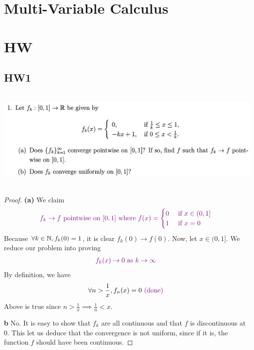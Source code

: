 \documentclass{report}
\begin{document}
\chapter{Multi-Variable Calculus}
\section{}
\chapter{HW}
\section{HW1}
\begin{question}{}{}
\includegraphics[height=5cm,width=18cm]{HW1.7}
\end{question}
\begin{proof}
\textbf{(a)} 
We claim 
\begin{align*}
\textcolor{violet}{f_k \to f\text{ pointwise  on $[0,1]$ where }f(x)=\begin{cases}
    0& \text{ if $x\in (0,1]$ } \\
    1& \text{ if $x=0$ }
\end{cases}}
\end{align*}
Because $\forall k\in\mathbb{N}, f_k(0)=1$, it is clear $f_k(0)\to f(0)$. Now, let $x \in (0,1]$. We reduce our problem into proving 
\begin{align*}
\textcolor{violet}{f_k(x)\to 0\text{ as $k \to \infty$ }}
\end{align*}
By definition, we have 
\begin{align*}
\forall n>\frac{1}{x}, f_n(x)=0\textcolor{violet}{\text{ (done) }}
\end{align*}
Above is true since $n>\frac{1}{x}\implies \frac{1}{n}<x$. 

\textbf{b}
No. It is easy to show that $f_k$ are all continuous and that $f$ is discontinuous at $0$. This let us deduce that the convergence is not uniform, since if it is, the function $f$ should have been continuous. 
\end{proof}
\end{document}
